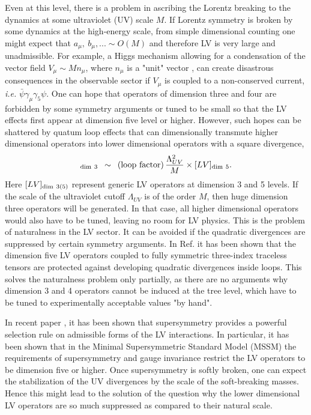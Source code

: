 \documentclass[12pt]{revtex4}
\begin{document}
Even at this level, there is a problem in ascribing the Lorentz breaking 
to the dynamics at some ultraviolet (UV) scale $M$. If Lorentz symmetry is broken by 
some dynamics at the high-energy scale, from simple dimensional counting  
one might expect that $a_\mu,~b_\mu,... \sim O(M)$
and therefore LV is very large and unadmissible. For example, a Higgs mechanism 
allowing for a condensation of the vector field $V_{\mu}\sim M n_\mu$, where $n_\mu$ is a 
"unit" vector \cite{Kostelecky:1989jw}, can create disastrous consequences in the observable sector if 
$V_\mu$ is coupled to a non-conserved current, {\em i.e.} $\bar \psi \gamma_\mu\gamma_5 \psi$.  
One can hope that operators of dimension three and four are forbidden by 
some symmetry arguments or tuned to be small so that the LV effects 
first appear at dimension five level \cite{MP:} 
or higher. However, such hopes can be shattered by quatum loop effects that 
can dimensionally transmute higher dimensional operators into lower dimensional operators
with a square divergence,
\begin{equation}
[LV]_{\rm dim~3} \,~\sim~\, ({\rm loop~factor}) \, 
\frac{\Lambda_{UV}^2}{M} 
\times [LV]_{{\rm dim}~5}. 
\label{transmute}
\end{equation}
Here $[LV]_{\rm dim~3(5)}$ represent generic LV operators at dimension
3 and 5 levels. If the scale of the ultraviolet cutoff $\Lambda_{UV}$
is of the order $M$, then huge dimension three operators will be
generated. In that case, all higher dimensional operators would also 
have to be tuned, leaving no room for LV physics. This is the problem
of naturalness in the LV sector. It can be avoided if the quadratic
divergences are suppressed by certain symmetry arguments. In
Ref. \cite{MP:} it has been shown that the dimension five LV operators
coupled to fully symmetric three-index traceless tensors are protected
against developing quadratic divergences inside loops. This solves the
naturalness problem only partially, as there are no arguments why
dimension 3 and 4 operators cannot be induced at the tree level, which
have to be tuned to experimentally acceptable values  "by hand".  

In recent paper \cite{GrootNibbelink:2004za}, it has been shown that
supersymmetry provides a powerful selection  rule on admissible forms
of the LV interactions. In particular, it has been shown that  in the
Minimal Supersymmetric Standard Model (MSSM) the requirements of
supersymmetry and gauge invariance restrict the LV operators to be
dimension five or higher. Once supersymmetry is softly broken, one
can expect the stabilization of the UV divergences by the scale of the
soft-breaking masses. Hence this might lead to the solution of the question
why the lower dimensional LV operators are so much suppressed as
compared to their natural scale. 
\end{document}
